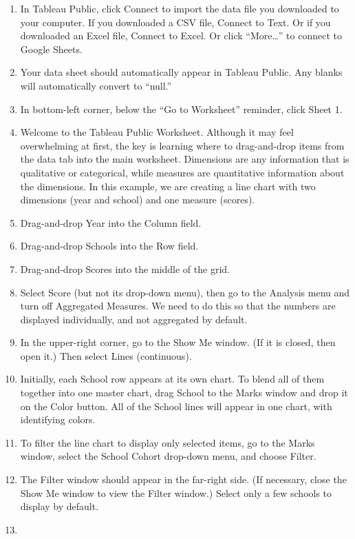 \documentclass[
  english,
]{book}
\begin{document}
\begin{enumerate}
\def\labelenumi{\arabic{enumi})}
\setcounter{enumi}{2}
\item
  In Tableau Public, click Connect to import the data file you downloaded to your computer. If you downloaded a CSV file, Connect to Text. Or if you downloaded an Excel file, Connect to Excel. Or click ``More\ldots{}'' to connect to Google Sheets.
\item
  Your data sheet should automatically appear in Tableau Public. Any blanks will automatically convert to ``null.''
\item
  In bottom-left corner, below the ``Go to Worksheet'' reminder, click Sheet 1.
\item
  Welcome to the Tableau Public Worksheet. Although it may feel overwhelming at first, the key is learning where to drag-and-drop items from the data tab into the main worksheet. Dimensions are any information that is qualitative or categorical, while measures are quantitative information about the dimensions. In this example, we are creating a line chart with two dimensions (year and school) and one measure (scores).
\item
  Drag-and-drop Year into the Column field.
\item
  Drag-and-drop Schools into the Row field.
\item
  Drag-and-drop Scores into the middle of the grid.
\item
  Select Score (but not its drop-down menu), then go to the Analysis menu and turn off Aggregated Measures. We need to do this so that the numbers are displayed individually, and not aggregated by default.
\item
  In the upper-right corner, go to the Show Me window. (If it is closed, then open it.) Then select Lines (continuous).
\item
  Initially, each School row appears at its own chart. To blend all of them together into one master chart, drag School to the Marks window and drop it on the Color button. All of the School lines will appear in one chart, with identifying colors.
\item
  To filter the line chart to display only selected items, go to the Marks window, select the School Cohort drop-down menu, and choose Filter.
\item
  The Filter window should appear in the far-right side. (If necessary, close the Show Me window to view the Filter window.) Select only a few schools to display by default.
\item

\end{enumerate}
\end{document}
